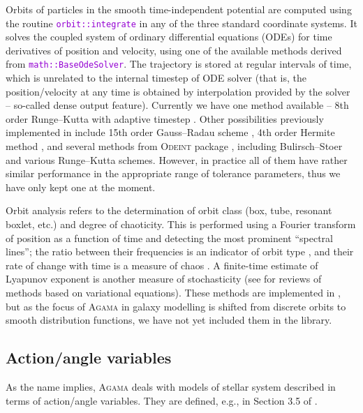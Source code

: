 \documentclass[12pt]{article}
\newcommand{\Agama}{\textsc{Agama}\xspace}
\newcommand{\ttt}[1]{\textcolor{darkviolet}{\texttt{#1}}}
\begin{document}
Orbits of particles in the smooth time-independent potential are computed using the routine \ttt{orbit::integrate} in any of the three standard coordinate systems. It solves the coupled system of ordinary differential equations (ODEs) for time derivatives of position and velocity, using one of the available methods derived from \ttt{math::BaseOdeSolver}. The trajectory is stored at regular intervals of time, which is unrelated to the internal timestep of ODE solver (that is, the  position/\-velocity at any time is obtained by interpolation provided by the solver -- so-called dense output feature). Currently we have one method available -- 8th order Runge--Kutta with adaptive timestep \cite{DOP853}. Other possibilities previously implemented in \cite{Vasiliev2013} include 15th order Gauss--Radau scheme \cite{IAS15}, 4th order Hermite method \cite{Hermite}, and several methods from \textsc{Odeint} package \cite{odeint}, including Bulirsch--Stoer and various Runge--Kutta schemes. However, in practice all of them have rather similar performance in the appropriate range of tolerance parameters, thus we have only kept one at the moment.

Orbit analysis refers to the determination of orbit class (box, tube, resonant boxlet, etc.) and degree of chaoticity. This is performed using a Fourier transform of position as a function of time and detecting the most prominent ``spectral lines''; the ratio between their frequencies is an indicator of orbit type \cite{BinneySpergel1984, CarpinteroAguilar1998}, and their rate of change with time is a measure of chaos \cite{ValluriMerritt1998}. A finite-time estimate of Lyapunov exponent is another measure of stochasticity (see \cite{Carpintero2014, Skokos2010} for reviews of methods based on variational equations). These methods are implemented in \cite{Vasiliev2013}, but as the focus of \Agama in galaxy modelling is shifted from discrete orbits to smooth distribution functions, we have not yet included them in the library.


\subsection{Action/angle variables}  \label{sec:ActionAngle}

As the name implies, \Agama deals with models of stellar system described in terms of action/angle variables. They are defined, e.g., in Section 3.5 of \cite{BinneyTremaine}.
\end{document}
